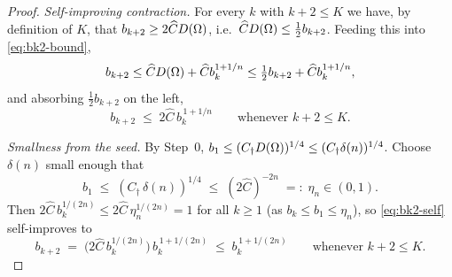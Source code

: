 \begin{proof}
\emph{Self-improving contraction.} For every $k$ with $k+2\le K$ we have,
by definition of $K$, that $b_{k+2}\ge2\widehat C D(\Omega)$, i.e.\
$\widehat C D(\Omega)\le\tfrac12 b_{k+2}$. Feeding this into
\eqref{eq:bk2-bound},
\[
   b_{k+2}\le\widehat C D(\Omega)+\widehat C b_k^{1+1/n}
   \le\tfrac12 b_{k+2}+\widehat C b_k^{1+1/n},
\]
and absorbing $\tfrac12 b_{k+2}$ on the left,
\begin{equation}\label{eq:bk2-self}
   b_{k+2}\;\le\;2\widehat C\,b_k^{\,1+1/n}
   \qquad\text{whenever }k+2\le K .
\end{equation}

\emph{Smallness from the seed.} By Step~0, $b_1\le(C_\dagger D(\Omega))^{1/4}
\le(C_\dagger\delta(n))^{1/4}$. Choose $\delta(n)$ small enough that
\begin{equation}\label{eq:seed-smallness}
   b_1\;\le\;(C_\dagger\,\delta(n))^{1/4}\;\le\;(2\widehat C)^{-2n}
   \;=:\;\eta_n\in(0,1).
\end{equation}
Then $2\widehat C\,b_k^{1/(2n)}\le2\widehat C\,\eta_n^{1/(2n)}=1$ for all
$k\ge1$ (as $b_k\le b_1\le\eta_n$), so \eqref{eq:bk2-self} self-improves
to
\begin{equation}\label{eq:bk2-power}
   b_{k+2}\;=\;\bigl(2\widehat C\,b_k^{1/(2n)}\bigr)\,b_k^{\,1+1/(2n)}
   \;\le\;b_k^{\,1+1/(2n)}\qquad\text{whenever }k+2\le K .
\end{equation}


\end{proof}
